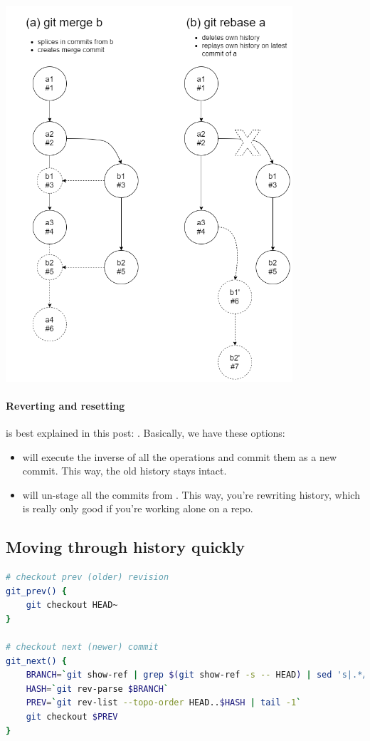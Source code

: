 \includegraphics[width=0.8\textwidth]{images/merge_vs_rebase.png}

\paragraph{Reverting and resetting} is best explained in this post: . Basically, we have these options: 

\begin{itemize}
    \item {} will execute the inverse of all the operations and commit them as a new commit. This way, the old history stays intact.
    \item {} will un-stage all the commits from . This way, you're rewriting history, which is really only good if you're working alone on a repo.
\end{itemize}


\subsection{Moving through history quickly}
\begin{lstlisting}[language=bash]
# checkout prev (older) revision
git_prev() {
    git checkout HEAD~
}

# checkout next (newer) commit
git_next() {
    BRANCH=`git show-ref | grep $(git show-ref -s -- HEAD) | sed 's|.*/\(.*\)|\1|' | grep -v HEAD | sort | uniq`
    HASH=`git rev-parse $BRANCH`
    PREV=`git rev-list --topo-order HEAD..$HASH | tail -1`
    git checkout $PREV
}
\end{lstlisting}

